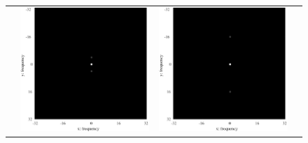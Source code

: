 \begin{figure}[H]
\begin{tabularx}{\textwidth}{p{}CCC}
        \begin{minipage}{.05\textwidth}
            \centering
        \end{minipage}                                                     &
        \begin{minipage}{.25\textwidth}
            \centering
            \includegraphics[keepaspectratio,width=.9\textwidth]{../../Figures/08_24_img4-fft.pdf}
        \end{minipage}  &
        \begin{minipage}{.25\textwidth}
            \centering
            \includegraphics[keepaspectratio,width=.9\textwidth]{../../Figures/08_25_img16-fft.pdf}

\end{minipage}
\end{tabularx}
\end{figure}
